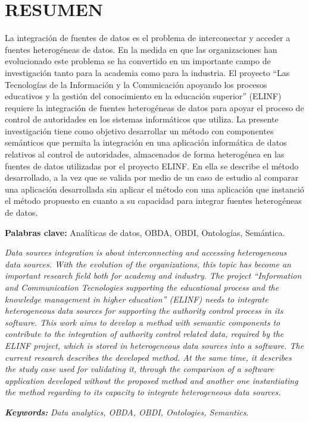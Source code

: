 \chapter*{\large RESUMEN}

La integración de fuentes de datos es el problema de interconectar y acceder a fuentes heterogéneas de datos. En la medida en que las organizaciones han evolucionado este problema se ha convertido en un importante campo de investigación tanto para la academia como para la industria. El proyecto ``Las Tecnologías de la Información y la Comunicación apoyando los procesos educativos y la gestión del conocimiento en la educación superior'' (ELINF) requiere la integración de fuentes heterogéneas de datos para apoyar el proceso de control de autoridades en los sistemas informáticos que utiliza. La presente investigación tiene como objetivo desarrollar un método con componentes semánticos que permita la integración en una aplicación informática de datos relativos al control de autoridades, almacenados de forma heterogénea en las fuentes de datos utilizadas por el proyecto ELINF. En ella se describe el método desarrollado, a la vez que se valida por medio de un caso de estudio al comparar una aplicación desarrollada sin aplicar el método con una aplicación que instanció el método propuesto en cuanto a su capacidad para integrar fuentes heterogéneas de datos.

\textbf{Palabras clave:} Analíticas de datos, OBDA, OBDI, Ontologías, Semántica.

\textit{Data sources integration is about interconnecting and accessing heterogeneous data sources. With the evolution of the organizations, this topic has become an important research field both for academy and industry. The project ``Information and Communication Tecnologies supporting the educational process and the knowledge management in higher education'' (ELINF) needs to integrate heterogeneous data sources for supporting the authority control process in its software. This work aims to develop a method with semantic components to contribute to the integration of authority control related data, required by the ELINF project, which is stored in heterogeneous data sources  into a software. The current research describes the developed method. At the same time, it describes the study case used for validating it, through the comparison of a software application developed without the proposed method and another one instantiating the method regarding to its capacity to integrate heterogeneous data sources.}

\textit{\textbf{Keywords: }} \textit{Data analytics, OBDA, OBDI, Ontologies, Semantics}.